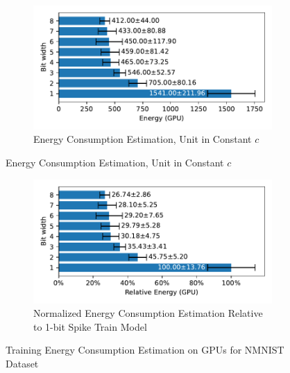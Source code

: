         \begin{figure}[H]
            \centering
            \begin{subfigure}[H]{\textwidth}
                \includegraphics[width=\textwidth]{../standard/NMNIST/plots/nmnist_train_energy_gpu_horizontal.pdf}
                \caption{Energy Consumption Estimation, Unit in Constant $c$}
            \end{subfigure}
        \end{figure}
        \begin{figure}[H]
            \centering
            \ContinuedFloat
            \begin{subfigure}[H]{\textwidth}
                \includegraphics[width=\textwidth]{../standard/NMNIST/plots/nmnist_train_relative_energy_gpu_horizontal.pdf}
                \caption{Normalized Energy Consumption Estimation Relative to 1-bit Spike Train Model}
            \end{subfigure}
            \caption{Training Energy Consumption Estimation on GPUs for NMNIST Dataset}
        \end{figure}

    \label{appendix:energy_gpu_dvs_gesture}

